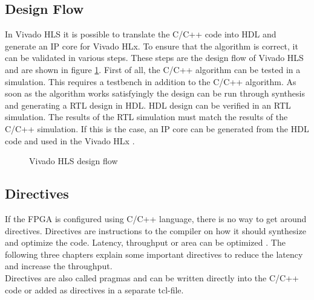\subsection{Design Flow} \label{ch:design_flow}
In Vivado HLS it is possible to translate the C/C++ code into HDL and generate
an IP core for Vivado HLx. To ensure that the algorithm is correct, it can be validated in various steps. These steps are the design flow of Vivado HLS and are shown in figure \ref{fig:hls_design_flow}.
First of all, the C/C++ algorithm can be tested in a simulation. This requires a
testbench in addition to the C/C++ algorithm. As soon as the algorithm works
satisfyingly the design can be run through synthesis and generating a RTL design
in HDL. HDL design can be verified in an RTL simulation. The results of the RTL
simulation must match the results of the C/C++ simulation. If this is the case,
an IP core can be generated from the HDL code and used in the Vivado HLx \cite{vivado_hls}.

\begin{figure}[tb!]
    \centering
    
    \caption{Vivado HLS design flow}
    \label{fig:hls_design_flow}
\end{figure}

\subsection{Directives} \label{ch:directives}
If the FPGA is configured using C/C++ language, there is no way to get around directives. Directives are instructions to the compiler on how it should synthesize and optimize the code. Latency, throughput or area can be optimized \cite{pragma}. The following three chapters explain some important directives to reduce the latency and increase the throughput. \\
Directives are also called pragmas and can be written directly into the C/C++ code or added as directives in a separate tcl-file.



